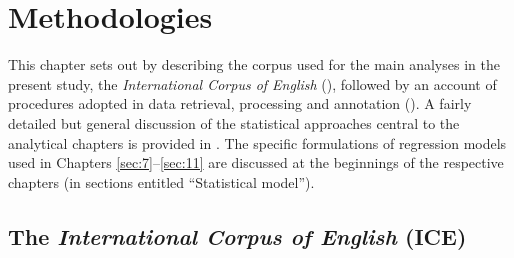\chapter{\label{bkm:Ref475086195}Methodologies}\label{sec:6}

This chapter sets out by describing the corpus used for the main analyses in the present study, the \textit{International Corpus of English} (), followed by an account of procedures adopted in data retrieval, processing and annotation (). A fairly detailed but general discussion of the statistical approaches central to the analytical chapters is provided in . The specific formulations of regression models used in Chapters \ref{sec:7}–\ref{sec:11} are discussed at the beginnings of the respective chapters (in sections entitled “Statistical model”).

\section{\label{bkm:Ref466296362}\label{bkm:Ref52284624}\label{bkm:Ref52284673}\label{bkm:Ref58229970}\label{bkm:Ref73115312}\label{bkm:Ref82554550}\label{bkm:Ref89925109}\label{bkm:Ref118499987}\label{bkm:Ref118500361}\label{bkm:Ref118501487}The \textit{International Corpus of English} (ICE)}\label{sec:6.1}


